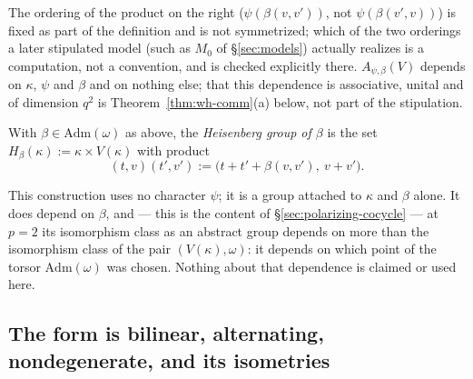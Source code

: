 \begin{scope}
The ordering of the product on the right ($\psi(\beta(v,v'))$, not
$\psi(\beta(v',v))$) is fixed as part of the definition and is not
symmetrized; which of the two orderings a later stipulated model (such as
$M_0$ of \S\ref{sec:models}) actually realizes is a computation, not a
convention, and is checked explicitly there. $A_{\psi,\beta}(V)$ depends on
$\kappa$, $\psi$ and $\beta$ and on nothing else; that this dependence is
associative, unital and of dimension $q^2$ is Theorem~\ref{thm:wh-comm}(a)
below, not part of the stipulation.
\end{scope}


\begin{definition}
\label{def:heisenberg-group}
With $\beta \in \mathrm{Adm}(\omega)$ as above, the \emph{Heisenberg group of
$\beta$} is the set $H_\beta(\kappa) := \kappa \times V(\kappa)$ with product
\[
(t,v)(t',v') := \big(t+t'+\beta(v,v'),\ v+v'\big).
\]
\end{definition}

\begin{scope}
This construction uses no character $\psi$; it is a group attached to
$\kappa$ and $\beta$ alone. It does depend on $\beta$, and — this is the
content of \S\ref{sec:polarizing-cocycle} — at $p=2$ its isomorphism class as
an abstract group depends on more than the isomorphism class of the pair
$(V(\kappa),\omega)$: it depends on which point of the torsor
$\mathrm{Adm}(\omega)$ was chosen. Nothing about that dependence is claimed
or used here.
\end{scope}


\subsection{The form is bilinear, alternating, nondegenerate, and its
isometries}

